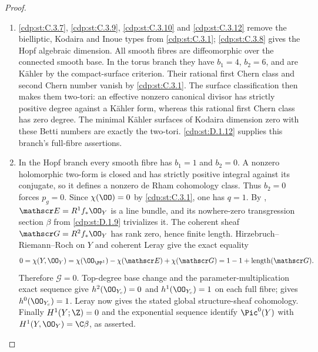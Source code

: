 \begin{proof}

\begin{enumerate}[label={$\langle1\rangle$\arabic*.},leftmargin=*]
\item \ref{cdp:st:C.3.7}, \ref{cdp:st:C.3.9}, \ref{cdp:st:C.3.10} and \ref{cdp:st:C.3.12} remove the bielliptic,
Kodaira and Inoue types from \ref{cdp:st:C.3.1}; \ref{cdp:st:C.3.8} gives the Hopf algebraic
dimension. All smooth fibres are diffeomorphic over the
connected smooth base. In the torus branch they have
$b_1=4$, $b_2=6$, and are K\"ahler by the compact-surface
criterion. Their rational first Chern class and second
Chern number vanish by \ref{cdp:st:C.3.1}. The surface classification
then makes them two-tori: an effective nonzero canonical
divisor has strictly positive degree against a K\"ahler
form, whereas this rational first Chern class has zero
degree. The minimal K\"ahler surfaces of Kodaira dimension
zero with these Betti numbers are exactly the two-tori.
\ref{cdp:st:D.1.12} supplies this branch's full-fibre assertions.

\item In the Hopf branch every smooth fibre has
$b_1=1$ and $b_2=0$. A nonzero holomorphic two-form
is closed and has strictly positive integral against
its conjugate, so it defines a nonzero de Rham
cohomology class. Thus $b_2=0$ forces $p_g=0$.
Since $\chi(\OO)=0$ by \ref{cdp:st:C.3.1}, one has $q=1$.
By , $\mathscr E=R^1f_*\OO_Y$ is a line bundle,
and its nowhere-zero transgression section $\beta$
from \ref{cdp:st:D.1.9} trivializes it. The coherent sheaf
$\mathscr G=R^2f_*\OO_Y$ has rank zero, hence finite
length. Hirzebruch--Riemann--Roch on $Y$ and coherent
Leray give the exact equality
\[
 0=\chi(Y,\OO_Y)
   =\chi(\OO_{\PP^1})-\chi(\mathscr E)+\chi(\mathscr G)
   =1-1+\operatorname{length}(\mathscr G).
\]
Therefore $\mathscr G=0$. Top-degree base change and
the parameter-multiplication exact sequence give
$h^2(\OO_{Y_c})=0$ and $h^1(\OO_{Y_c})=1$ on each
full fibre;  gives $h^0(\OO_{Y_c})=1$.
Leray now gives the stated global structure-sheaf
cohomology. Finally $H^1(Y;\Z)=0$ and the exponential
sequence identify $\Pic^0(Y)$ with
$H^1(Y,\OO_Y)=\C\beta$, as asserted.

\end{enumerate}
\end{proof}